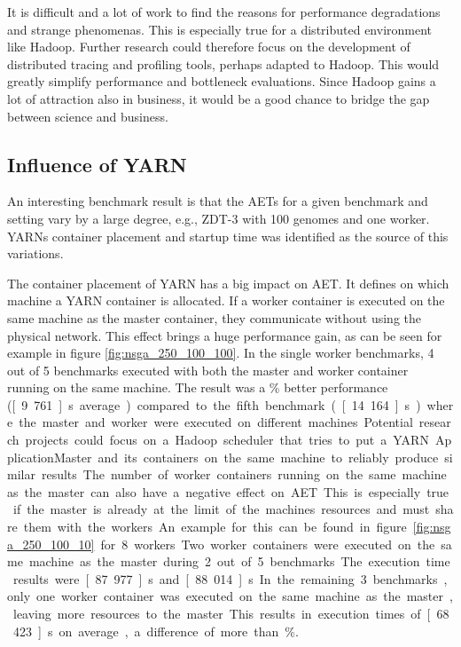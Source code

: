 It is difficult and a lot of work to find the reasons for performance degradations and strange phenomenas. This is especially true for a distributed environment like Hadoop. Further research could therefore focus on the development of distributed tracing and profiling tools, perhaps adapted to Hadoop. This would greatly simplify performance and bottleneck evaluations. Since Hadoop gains a lot of attraction also in business, it would be a good chance to bridge the gap between science and business.

\subsection{Influence of YARN}
\label{chap:evaluation:influence-yarn}
An interesting benchmark result is that the AETs for a given benchmark and setting vary by a large degree, e.g., ZDT-3 with 100 genomes and one worker. YARNs container placement and startup time was identified as the source of this variations.

The container placement of YARN has a big impact on AET. It defines on which machine a YARN container is allocated. If a worker container is executed on the same machine as the master container, they communicate without using the physical network. This effect brings a huge performance gain, as can be seen for example in figure \ref{fig:nsga_250_100_100}. In the single worker benchmarks, 4 out of 5 benchmarks executed with both the master and worker container running on the same machine. The result was a \unit[50]{\%} better performance (\unit[9.761]{s} average) compared to the fifth benchmark (\unit[14.164]{s}) where the master and worker were executed on different machines. Potential research projects could focus on a Hadoop scheduler that tries to put a YARN ApplicationMaster and its containers on the same machine to reliably produce similar results.

The number of worker containers running on the same machine as the master can also have a negative effect on AET. This is especially true if the master is already at the limit of the machines resources and must share them with the workers. An example for this can be found in figure \ref{fig:nsga_250_100_10} for 8 workers. Two worker containers were executed on the same machine as the master during 2 out of 5 benchmarks. The execution time results were \unit[87.977]{s} and \unit[88.014]{s}. In the remaining 3 benchmarks, only one worker container was executed on the same machine as the master, leaving more resources to the master. This results in execution times of \unit[68.423]{s} on average, a difference of more than \unit[20]{\%}.

